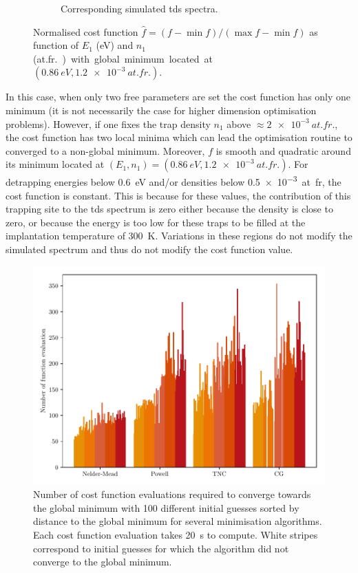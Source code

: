 \begin{figure} [h!]
\begin{subfigure}[t]{0.7\linewidth}
            \caption{Corresponding simulated \gls{tds} spectra.}
        \end{subfigure}%
    \caption{Normalised cost function $\hat{f} = (f - \min{f})/(\max{f}-\min{f})$ as function of $E_1$ (\si{eV}) and $n_1$ (\si{at.fr.}) with global minimum located at $(\SI{0.86}{eV}, \SI{1.2e-3}{at.fr.})$.}
\end{figure}

In this case, when only two free parameters are set the cost function has only one minimum (it is not necessarily the case for higher dimension optimisation problems).
However, if one fixes the trap density $n_1$ above $\approx \SI{2e-3}{at.fr.}$, the cost function has two local minima which can lead the optimisation routine to converged to a non-global minimum.
Moreover, $f$ is smooth and quadratic around its minimum located at $(E_1, n_1) = (\SI{0.86}{eV}, \SI{1.2e-3}{at.fr.})$.
For detrapping energies below \SI{0.6}{eV} and/or densities below \SI{0.5e-3}{at.fr}, the cost function is constant.
This is because for these values, the contribution of this trapping site to the \gls{tds} spectrum is zero either because the density is close to zero, or because the energy is too low for these traps to be filled at the implantation temperature of \SI{300}{K}.
Variations in these regions do not modify the simulated spectrum and thus do not modify the cost function value.

\begin{figure} [ht]
    \centering
    \includegraphics[width=\linewidth]{Figures/Chapter3/Parametric_optimisation/algorithms_perfs.pdf}
    \caption{Number of cost function evaluations required to converge towards the global minimum with 100 different initial guesses sorted by distance to the global minimum for several minimisation algorithms. Each cost function evaluation takes \SI{20}{s} to compute. White stripes correspond to initial guesses for which the algorithm did not converge to the global minimum.}
\end{figure}


